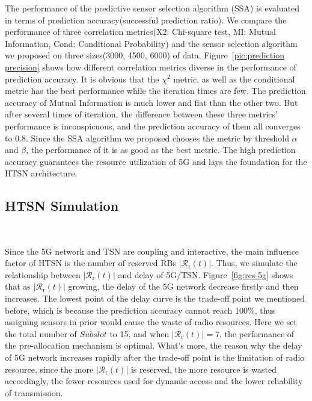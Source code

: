 \documentclass{SCIS2021}
\begin{document}
	\par  The performance of the predictive sensor selection algorithm (SSA) is evaluated in terms of prediction accuracy(successful prediction ratio). We compare the performance of three correlation metrics(X2: Chi-square test, MI: Mutual Information, Cond: Conditional Probability) and the sensor selection algorithm we proposed on three sizes(3000, 4500, 6000) of data. Figure~\ref{pic:prediction precision} shows how different correlation metrics diverse in the performance of prediction accuracy. It is obvious that the $\chi^{2}$ metric, as well as the conditional metric has the best performance while the iteration times are few. The prediction accuracy of Mutual Information is much lower and flat than the other two. But after several times of iteration, the difference between these three metrics' performance is inconspicuous, and the prediction accuracy of them all converges to 0.8. Since the SSA algorithm we proposed chooses the metric by threshold $\alpha$ and $\beta$, the performance of it is as good as the best metric. The high prediction accuracy guarantees the resource utilization of 5G and lays the foundation for the HTSN architecture.
	
	
	\subsection{HTSN Simulation}~{}
	\par Since the 5G network and TSN are coupling and interactive, the main influence factor of HTSN is the number of reserved RBs $\left|\mathcal{R}_\mathrm{r}(t)\right|$. Thus, we simulate the relationship between $\left|\mathcal{R}_\mathrm{r}(t)\right|$ and delay of 5G/TSN. Figure~\ref{fig:res-5g} shows that as $\left|\mathcal{R}_\mathrm{r}(t)\right|$ growing, the delay of the 5G network decrease firstly and then increases. The lowest point of the delay curve is the trade-off point we mentioned before, which is because the prediction accuracy cannot reach 100$\%$, thus assigning sensors in prior would cause the waste of radio resources. Here we set the total number of $Subslot$ to 15, and when $\left|\mathcal{R}_\mathrm{r}(t)\right|=7$, the performance of the pre-allocation mechanism is optimal. What's more, the reason why the delay of 5G network increases rapidly after the trade-off point is the limitation of radio resource, since the more $\left|\mathcal{R}_\mathrm{r}(t)\right|$ is reserved, the more resource is wasted accordingly, the fewer resources used for dynamic access and the lower reliability of transmission.
	
\end{document}
